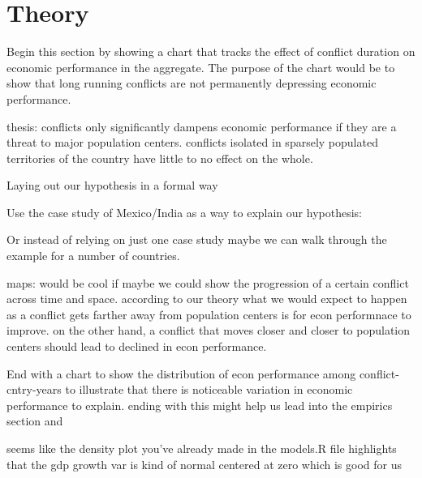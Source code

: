 \section{Theory}
\label{theory}

Begin this section by showing a chart that tracks the effect of conflict duration on economic performance in the aggregate. The purpose of the chart would be to show that long running conflicts are not permanently depressing economic performance. 

thesis: conflicts only significantly dampens economic performance if they are a threat to major population centers. conflicts isolated in sparsely populated territories of the country have little to no effect on the whole. 

Laying out our hypothesis in a formal way

	Use the case study of Mexico/India as a way to explain our hypothesis: 

	Or instead of relying on just one case study maybe we can walk through the example for a number of countries.

	maps: would be cool if maybe we could show the progression of a certain conflict across time and space. according to our theory what we would expect to happen as a conflict gets farther away from population centers is for econ performnace to improve. on the other hand, a conflict that moves closer and closer to population centers should lead to declined in econ performance.

End with a chart to show the distribution of econ performance among conflict-cntry-years to illustrate that there is noticeable variation in economic performance to explain. ending with this might help us lead into the empirics section and 

	seems like the density plot you've already made in the models.R file highlights that the gdp growth var is kind of normal centered at zero which is good for us	